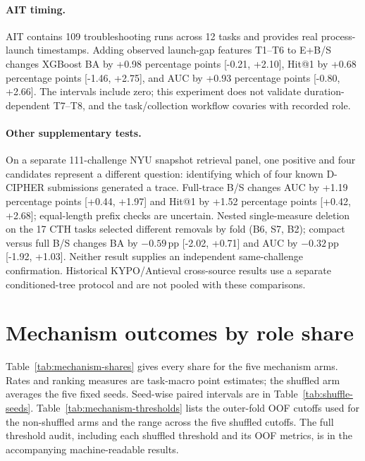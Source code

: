 \documentclass[10pt]{article}
\newcommand{\pp}{\ensuremath{\,\mathrm{pp}}}
\begin{document}
\paragraph{AIT timing.} AIT contains 109 troubleshooting runs across 12 tasks and provides real process-launch timestamps. Adding observed launch-gap features T1--T6 to E+B/S changes XGBoost BA by +0.98 percentage points [-0.21, +2.10], Hit@1 by +0.68 percentage points [-1.46, +2.75], and AUC by +0.93 percentage points [-0.80, +2.66]. The intervals include zero; this experiment does not validate duration-dependent T7--T8, and the task/collection workflow covaries with recorded role.

\paragraph{Other supplementary tests.} On a separate 111-challenge NYU snapshot retrieval panel, one positive and four candidates represent a different question: identifying which of four known D-CIPHER submissions generated a trace. Full-trace B/S changes AUC by +1.19 percentage points [+0.44, +1.97] and Hit@1 by +1.52 percentage points [+0.42, +2.68]; equal-length prefix checks are uncertain. Nested single-measure deletion on the 17 CTH tasks selected different removals by fold (B6, S7, B2); compact versus full B/S changes BA by $-0.59\pp$ [-2.02, +0.71] and AUC by $-0.32\pp$ [-1.92, +1.03]. Neither result supplies an independent same-challenge confirmation. Historical KYPO/Antieval cross-source results use a separate conditioned-tree protocol and are not pooled with these comparisons.

\section{Mechanism outcomes by role share}
Table~\ref{tab:mechanism-shares} gives every share for the five mechanism arms. Rates and ranking measures are task-macro point estimates; the shuffled arm averages the five fixed seeds. Seed-wise paired intervals are in Table~\ref{tab:shuffle-seeds}. Table~\ref{tab:mechanism-thresholds} lists the outer-fold OOF cutoffs used for the non-shuffled arms and the range across the five shuffled cutoffs. The full threshold audit, including each shuffled threshold and its OOF metrics, is in the accompanying machine-readable results.
\end{document}
